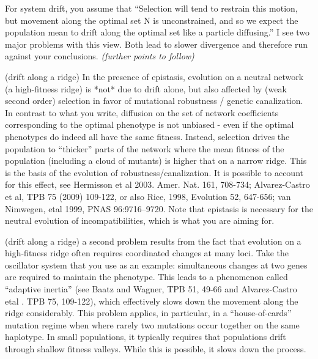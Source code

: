 \begin{point}{}
    For system drift, you assume that ``Selection will tend to restrain this
motion, but movement along the optimal set N is unconstrained, and so we expect
the population mean to drift along the optimal set like a particle diffusing.''
I see two major problems with this view. Both lead to slower divergence and
therefore run against your conclusions.
    \textit{(further points to follow)}
\end{point}


\begin{point}{(drift along a ridge)}
    In the presence of epistasis, evolution on a neutral network (a high-fitness
  ridge) is *not* due to drift alone, but also affected by (weak second order)
selection in favor of mutational robustness / genetic canalization. In contrast
to what you write, diffusion on the set of network coefficients corresponding
to the optimal phenotype is not unbiased - even if the optimal phenotypes do
indeed all have the same fitness. Instead, selection drives the population to
``thicker'' parts of the network where the mean fitness of the population
(including a cloud of mutants) is higher that on a narrow ridge. This is the
basis of the evolution of robustness/canalization. It is possible to account
for this effect, see Hermisson et al 2003. Amer. Nat. 161, 708-734;
Alvarez-Castro et al, TPB 75 (2009) 109-122, or also Rice, 1998, Evolution 52,
647-656; van Nimwegen, etal 1999, PNAS 96:9716–9720. Note that epistasis is
necessary for the neutral evolution of incompatibilities, which is what you are
aiming for.
\end{point}


\begin{point}{(drift along a ridge)}
    a second problem results from the fact that evolution on a high-fitness ridge
  often requires coordinated changes at many loci. Take the oscillator system
that you use as an example: simultaneous changes at two genes are required to
maintain the phenotype. This leads to a phenomenon called ``adaptive inertia''
(see Baatz and Wagner, TPB 51, 49-66 and Alvarez-Castro etal . TPB 75, 109-122),
which effectively slows down the movement along the ridge considerably. This
problem applies, in particular, in a ``house-of-cards'' mutation regime when
where rarely two mutations occur together on the same haplotype. In small
populations, it typically requires that populations drift through shallow
fitness valleys. While this is possible, it slows down the process.  
\end{point}

